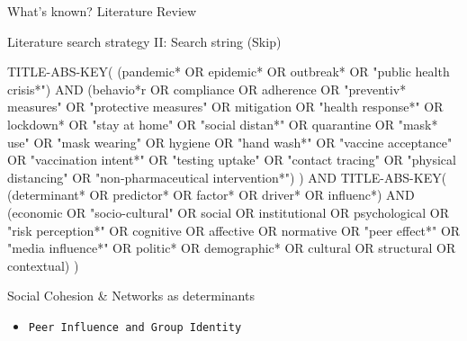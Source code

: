 \documentclass[
  ignorenonframetext,
]{beamer}
\newenvironment{Shaded}{\begin{snugshade}}{\end{snugshade}}
\newcommand{\NormalTok}[1]{\textcolor[rgb]{0.00,0.23,0.31}{#1}}
\newcommand{\OperatorTok}[1]{\textcolor[rgb]{0.37,0.37,0.37}{#1}}
\newcommand{\StringTok}[1]{\textcolor[rgb]{0.13,0.47,0.30}{#1}}
\providecommand{\tightlist}{%
  \setlength{\itemsep}{0pt}\setlength{\parskip}{0pt}}\usepackage{longtable,booktabs,array}
\begin{document}
\begin{frame}[fragile]{What's known? Literature Review}
\begin{block}{Literature search strategy II: Search string (Skip)}
\label{literature-search-strategy-ii-search-string-skip}
\begin{Shaded}
\begin{Highlighting}[]
\NormalTok{TITLE}\OperatorTok{{-}}\NormalTok{ABS}\OperatorTok{{-}}\NormalTok{KEY(}
\NormalTok{  (pandemic}\OperatorTok{*}\NormalTok{ OR epidemic}\OperatorTok{*}\NormalTok{ OR outbreak}\OperatorTok{*}\NormalTok{ OR }\StringTok{"public health crisis*"}\NormalTok{)}
\NormalTok{  AND}
\NormalTok{  (behavio}\OperatorTok{*}\NormalTok{r OR compliance OR adherence OR }\StringTok{"preventiv* measures"}\NormalTok{ OR }\StringTok{"protective measures"}\NormalTok{ OR mitigation OR }\StringTok{"health response*"} 
\NormalTok{    OR lockdown}\OperatorTok{*}\NormalTok{ OR }\StringTok{"stay at home"}\NormalTok{ OR }\StringTok{"social distan*"}\NormalTok{ OR quarantine OR }\StringTok{"mask* use"}\NormalTok{ OR }\StringTok{"mask wearing"}\NormalTok{ OR hygiene OR }\StringTok{"hand wash*"} 
\NormalTok{    OR }\StringTok{"vaccine acceptance"}\NormalTok{ OR }\StringTok{"vaccination intent*"}\NormalTok{ OR }\StringTok{"testing uptake"}\NormalTok{ OR }\StringTok{"contact tracing"}\NormalTok{ OR }\StringTok{"physical distancing"}\NormalTok{ OR }\StringTok{"non{-}pharmaceutical intervention*"}\NormalTok{)}
\NormalTok{)}
\NormalTok{AND}
\NormalTok{TITLE}\OperatorTok{{-}}\NormalTok{ABS}\OperatorTok{{-}}\NormalTok{KEY(}
\NormalTok{  (determinant}\OperatorTok{*}\NormalTok{ OR predictor}\OperatorTok{*}\NormalTok{ OR factor}\OperatorTok{*}\NormalTok{ OR driver}\OperatorTok{*}\NormalTok{ OR influenc}\OperatorTok{*}\NormalTok{)}
\NormalTok{  AND}
\NormalTok{  (economic OR }\StringTok{"socio{-}cultural"}\NormalTok{ OR social OR institutional OR psychological OR }\StringTok{"risk perception*"}\NormalTok{ OR cognitive OR affective OR normative }
\NormalTok{    OR }\StringTok{"peer effect*"}\NormalTok{ OR }\StringTok{"media influence*"}\NormalTok{ OR politic}\OperatorTok{*}\NormalTok{ OR demographic}\OperatorTok{*}\NormalTok{ OR cultural OR structural OR contextual)}
\NormalTok{)}
\end{Highlighting}
\end{Shaded}
\end{block}

\begin{block}{Social Cohesion \& Networks as determinants}
\label{social-cohesion-networks-as-determinants}
\begin{itemize}
\tightlist
\item
  \texttt{Peer\ Influence\ and\ Group\ Identity}


\end{itemize}
\end{block}
\end{frame}
\end{document}

